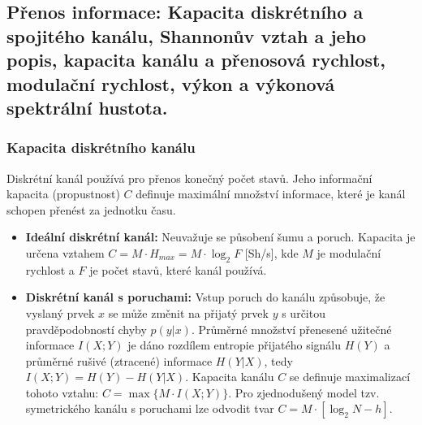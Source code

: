 \subsection{Přenos informace: Kapacita diskrétního a spojitého kanálu, Shannonův vztah a jeho popis, kapacita kanálu a přenosová rychlost, modulační rychlost, výkon a výkonová spektrální hustota.}
    \subsubsection{Kapacita diskrétního kanálu}
        Diskrétní kanál používá pro přenos konečný počet stavů. Jeho informační kapacita (propustnost) $C$ definuje maximální množství informace, které je kanál schopen přenést za jednotku času.
        \begin{itemize}
            \item \textbf{Ideální diskrétní kanál:} Neuvažuje se působení šumu a poruch. Kapacita je určena vztahem $C = M \cdot H_{max} = M \cdot \log_2 F$ [Sh/s], kde $M$ je modulační rychlost a $F$ je počet stavů, které kanál používá.
            \item \textbf{Diskrétní kanál s poruchami:} Vstup poruch do kanálu způsobuje, že vyslaný prvek $x$ se může změnit na přijatý prvek $y$ s určitou pravděpodobností chyby $p(y|x)$. Průměrné množství přenesené užitečné informace $I(X;Y)$ je dáno rozdílem entropie přijatého signálu $H(Y)$ a průměrné rušivé (ztracené) informace $H(Y|X)$, tedy $I(X;Y) = H(Y) - H(Y|X)$. Kapacita kanálu $C$ se definuje maximalizací tohoto vztahu: $C = \max\{M \cdot I(X;Y)\}$. Pro zjednodušený model tzv. symetrického kanálu s poruchami lze odvodit tvar $C = M \cdot [\log_2 N - h]$.
        \end{itemize}
